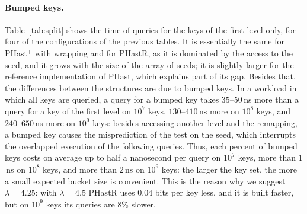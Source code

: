 \documentclass[11pt]{article}
\newcommand{\PHast}{PHast\xspace}
\newcommand{\PHastP}{PHast$^+$\xspace}
\newcommand{\PHastR}{PHastR\xspace}
\begin{document}
\paragraph{Bumped keys.}
Table~\ref{tab:split} shows the time of queries for the keys of the first
level only, for four of the configurations of the previous tables. It is
essentially the same for \PHastP with wrapping and for \PHastR, as it is
dominated by the access to the seed, and it grows with the size of the array
of seeds; it is slightly larger for the reference implementation of \PHast,
which explains part of its gap. Besides that, the differences between the
structures are due to bumped keys. In a workload in which all keys are queried, a query
for a bumped key takes $35$--$50$\,ns more than a query for a key of the
first level on $10^7$ keys, $130$--$410$\,ns more on $10^8$ keys, and
$240$--$650$\,ns more on $10^9$ keys: besides accessing another level and
the remapping, a bumped key causes the misprediction of the test
on the seed, which interrupts the overlapped execution of the following
queries. Thus, each percent of bumped keys costs on average up to half a
nanosecond per query on
$10^7$ keys, more than $1$\,ns on $10^8$ keys, and more than $2$\,ns on
$10^9$ keys: the larger the key set, the more a small expected bucket size
is convenient. This is the reason why we suggest $\lambda=4.25$: with
$\lambda=4.5$ \PHastR uses $0.04$ bits per key less, and it is built faster,
but on $10^9$ keys its queries are $8\%$ slower.
\end{document}
